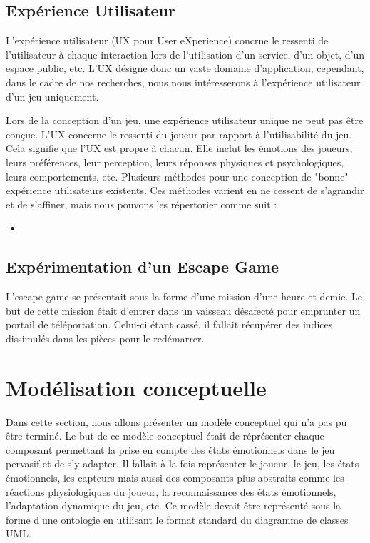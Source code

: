 \documentclass{article}
\begin{document}
	\subsection{Expérience Utilisateur}
		L'expérience utilisateur (UX pour User eXperience) concrne le ressenti de l'utilisateur à chaque interaction lors de l'utilisation d'un service, d'un objet, d'un espace public, etc. 
		L'UX désigne donc un vaste domaine d'application, cependant, dans le cadre de nos recherches, nous nous intéresserons à l'expérience utilisateur d'un jeu uniquement.\par
		Lors de la conception d'un jeu, une expérience utilisateur unique ne peut pas être conçue.
		L'UX concerne le ressenti du joueur par rapport à l'utilisabilité du jeu.
		Cela signifie que l'UX est propre à chacun.
		Elle inclut les émotions des joueurs, leurs préférences, leur perception, leurs réponses physiques et psychologiques, leurs comportements, etc.
		Plusieurs méthodes pour une conception de "bonne" expérience utilisateurs existents.
		Ces méthodes varient en ne cessent de s'agrandir et de s'affiner, mais nous pouvons les répertorier comme suit :
		\begin{itemize}
			\item 
		\end{itemize}
	\subsection{Expérimentation d'un Escape Game}
		L'escape game se présentait sous la forme d'une mission d'une heure et demie.
		Le but de cette mission était d'entrer dans un vaisseau désafecté pour emprunter un portail de téléportation.
		Celui-ci étant cassé, il fallait récupérer des indices dissimulés dans les pièces pour le redémarrer.

\section{Modélisation conceptuelle}
	Dans cette section, nous allons présenter un modèle conceptuel qui n'a pas pu être terminé. 
	Le but de ce modèle conceptuel était de réprésenter chaque composant permettant la prise en compte des états émotionnels dans le jeu pervasif et de s'y adapter. 
	Il fallait à la fois représenter le joueur, le jeu, les états émotionnels, les capteurs mais aussi des composants plus abstraits comme les réactions physiologiques du joueur, la reconnaissance des états émotionnels, l'adaptation dynamique du jeu, etc. 
	Ce modèle devait être représenté sous la forme d'une ontologie en utilisant le format standard du diagramme de classes UML.
\end{document}
